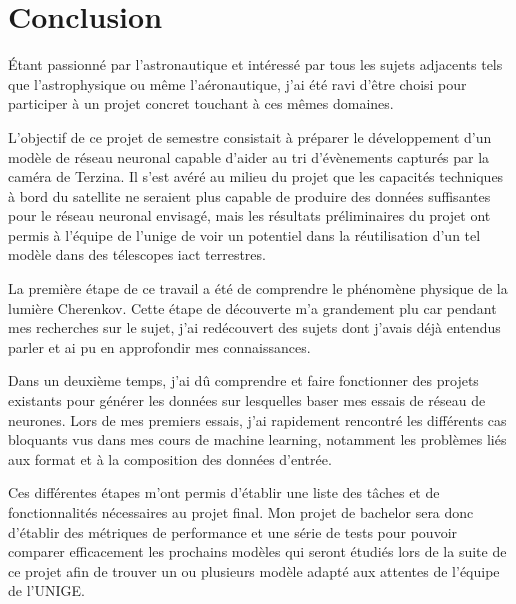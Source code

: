 \chapter*{Conclusion}

Étant passionné par l'astronautique et intéressé 
par tous les sujets adjacents tels que l'astrophysique ou même l'aéronautique, 
j'ai été ravi d'être choisi pour participer à un projet concret touchant à ces mêmes domaines.

L'objectif de ce projet de semestre consistait à préparer le développement d'un modèle de réseau neuronal
capable d'aider au tri d'évènements capturés par la caméra de Terzina. 
Il s'est avéré au milieu du projet que les capacités techniques à bord du satellite ne seraient plus capable 
de produire des données suffisantes pour le réseau neuronal envisagé, mais les résultats préliminaires du projet ont permis 
à l'équipe de l'\gls{unige} de voir un potentiel dans la réutilisation d'un tel modèle dans des télescopes \gls{iact} terrestres.

La première étape de ce travail a été de comprendre le phénomène physique
de la lumière Cherenkov. Cette étape de découverte m'a grandement plu car pendant mes recherches sur le sujet,
j'ai redécouvert des sujets dont j'avais déjà entendus parler et ai pu en approfondir mes connaissances.

Dans un deuxième temps, j'ai dû comprendre et faire fonctionner des projets existants pour générer les données 
sur lesquelles baser mes essais de réseau de neurones.
Lors de mes premiers essais, j'ai rapidement rencontré les différents cas bloquants vus dans mes cours de machine learning,
notamment les problèmes liés aux format et à la composition des données d'entrée.

Ces différentes étapes m'ont permis d'établir une liste des tâches et de fonctionnalités nécessaires au projet final.
Mon projet de bachelor sera donc d'établir des métriques de performance et une série de tests pour pouvoir comparer efficacement 
les prochains modèles qui seront étudiés lors de la suite de ce projet afin de trouver un ou plusieurs modèle adapté aux attentes de l'équipe de l'UNIGE.
